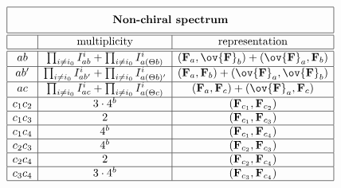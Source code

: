 \begin{equation*}
      \begin{array}{|c|c|c|} \hline
        \multicolumn{3}{|c|}{\rule[-3mm]{0mm}{8mm} 
\text{\bf Non-chiral spectrum}} \\ \hline\hline
       & \text{multiplicity} & \text{representation}\\ \hline\hline
ab  & \prod_{i\neq i_0}I^i_{ab} + \prod_{i\neq i_0}I^i_{ a(\Theta b)}  
& ({\bf F}_a,\ov{\bf F}_b) + (\ov{\bf F}_a,{\bf F}_b)  \\\hline 
ab'  & \prod_{i\neq i_0}I^i_{ab'} + \prod_{i\neq i_0}I^i_{ a(\Theta b)'}  
& ({\bf F}_a,{\bf F}_b) + (\ov{\bf F}_a,\ov{\bf F}_b)  \\\hline
ac &  \prod_{i\neq i_0}I^i_{ac} + \prod_{i\neq i_0}I^i_{ a(\Theta c)}   
& ({\bf F}_a,{\bf F}_c) + (\ov{\bf F}_a,{\bf F}_c)  \\\hline 
c_1c_2 & 3 \cdot 4^b & ({\bf F}_{c_1},{\bf F}_{c_2})  \\\hline 
c_1c_3 & 2           & ({\bf F}_{c_1},{\bf F}_{c_3})  \\\hline 
c_1c_4 &  4^b        & ({\bf F}_{c_1},{\bf F}_{c_4})  \\\hline 
c_2c_3 &  4^b        & ({\bf F}_{c_2},{\bf F}_{c_3})  \\\hline 
c_2c_4 & 2           & ({\bf F}_{c_2},{\bf F}_{c_4})  \\\hline 
c_3c_4 & 3 \cdot 4^b & ({\bf F}_{c_3},{\bf F}_{c_4})  \\\hline 
      \end{array}
    \end{equation*}

